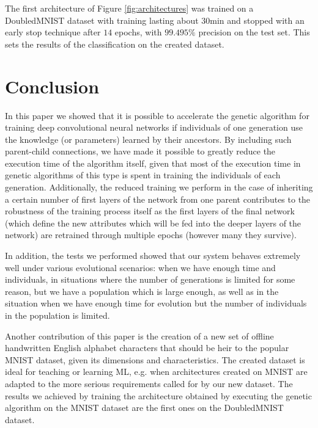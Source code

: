 \documentclass[eng]{simposium}
\begin{document}
The first architecture of Figure \ref{fig:architectures} was trained on a DoubledMNIST dataset with training lasting about  
$30$min and stopped with an early stop technique after $14$ epochs, with $99.495\%$ precision on the test set.  
This sets the results of the classification on the created dataset.  

\section{Conclusion} 

In this paper we showed that it is possible to accelerate the genetic algorithm for training deep convolutional neural networks 
if individuals of one generation use the knowledge (or parameters) learned by their ancestors. 
By including such parent-child connections, we have made it possible to greatly reduce the execution time of the algorithm itself, given that 
most of the execution time in genetic algorithms of this type is spent in training the individuals of each generation. 
Additionally, the reduced training we perform in the case of inheriting a certain number of first layers of the network from one parent 
contributes to the robustness of the training process itself as the first layers of the final network (which define the new attributes 
which will be fed into the deeper layers of the network) are retrained through multiple epochs (however many they survive). 

In addition, the tests we performed showed that our system behaves extremely well under various evolutional scenarios: 
when we have enough time and individuals, in situations where the number of generations is limited for some reason, but we have 
a population which is large enough, 
as well as in the situation when we have enough time for evolution but the number of individuals in the population is limited. 

Another contribution of this paper is the creation of a new set of offline handwritten English alphabet characters that should be 
heir to the popular MNIST dataset, given its dimensions and characteristics. The created dataset is ideal 
for teaching or learning ML, e.g. when architectures created on MNIST are adapted to the more serious requirements called for  
by our new dataset. 
The results we achieved by training the architecture obtained by executing the genetic algorithm on the MNIST dataset are 
the first ones on the DoubledMNIST dataset. 

\newpage
\end{document}
